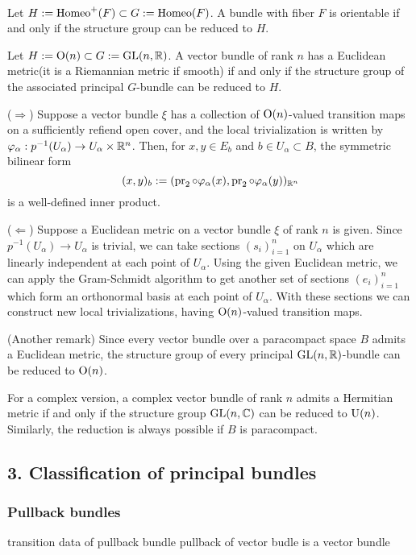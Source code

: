 \documentclass{../../small}
\begin{document}
\begin{ex*}\,
\begin{parts}
\item Let $H:=\operatorname{Homeo}^+(F)\subset G:=\operatorname{Homeo}(F)$.
A bundle with fiber $F$ is orientable if and only if the structure group can be reduced to $H$.
\item Let $H:=\mathrm{O}(n)\subset G:=\mathrm{GL}(n,\mathbb{R})$.
A vector bundle of rank $n$ has a Euclidean metric(it is a Riemannian metric if smooth) if and only if the structure group of the associated principal $G$-bundle can be reduced to $H$.

($\Rightarrow$)
Suppose a vector bundle $\xi$ has a collection of $\mathrm{O}(n)$-valued transition maps on a sufficiently refiend open cover, and the local trivialization is written by $\varphi_\alpha:p^{-1}(U_\alpha)\to U_\alpha\times\mathbb{R}^n$.
Then, for $x,y\in E_b$ and $b\in U_\alpha\subset B$, the symmetric bilinear form
\[(x,y)_b:=(\operatorname{pr}_2\circ\varphi_\alpha(x),\operatorname{pr}_2\circ\varphi_\alpha(y))_{\mathbb{R}^n}\]
is a well-defined inner product.

($\Leftarrow$)
Suppose a Euclidean metric on a vector bundle $\xi$ of rank $n$ is given.
Since $p^{-1}(U_\alpha)\to U_\alpha$ is trivial, we can take sections $(s_i)_{i=1}^n$ on $U_\alpha$ which are linearly independent at each point of $U_\alpha$.
Using the given Euclidean metric, we can apply the Gram-Schmidt algorithm to get another set of sections $(e_i)_{i=1}^n$ which form an orthonormal basis at each point of $U_\alpha$.
With these sections we can construct new local trivializations, having $\mathrm{O}(n)$-valued transition maps.

(Another remark)
Since every vector bundle over a paracompact space $B$ admits a Euclidean metric, the structure group of every principal $\mathrm{GL}(n,\mathbb{R})$-bundle can be reduced to $\mathrm{O}(n)$.

\item
For a complex version, a complex vector bundle of rank $n$ admits a Hermitian metric if and only if the structure group $\mathrm{GL}(n,\mathbb{C})$ can be reduced to $\mathrm{U}(n)$.
Similarly, the reduction is always possible if $B$ is paracompact.
\end{parts}
\end{ex*}


\subsection*{3. Classification of principal bundles}

\subsubsection*{Pullback bundles}

transition data of pullback bundle
pullback of vector budle is a vector bundle
\end{document}
